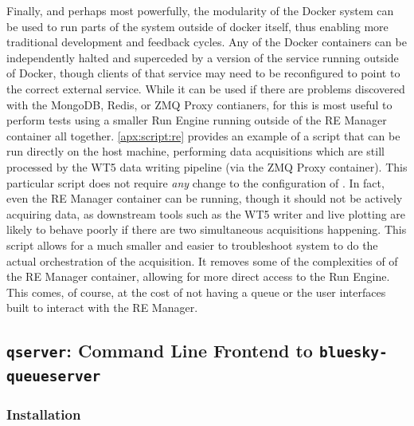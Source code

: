 Finally, and perhaps most powerfully, the modularity of the Docker system can be used to run parts of the system outside of docker itself, thus enabling more traditional development and feedback cycles.
Any of the Docker containers can be independently halted and superceded by a version of the service running outside of Docker, though clients of that service may need to be reconfigured to point to the correct external service.
While it can be used if there are problems discovered with the MongoDB, Redis, or ZMQ Proxy contianers, for \biab this is most useful to perform tests using a smaller Run Engine running outside of the RE Manager container all together.
\ref{apx:script:re} provides an example of a script that can be run directly on the host machine, performing data acquisitions which are still processed by the WT5 data writing pipeline (via the ZMQ Proxy container).
This particular script does not require \textit{any} change to the configuration of \biab.
In fact, even the RE Manager container can be running, though it should not be actively acquiring data, as downstream tools such as the WT5 writer and live plotting are likely to behave poorly if there are two simultaneous acquisitions happening.
This script allows for a much smaller and easier to troubleshoot system to do the actual orchestration of the acquisition.
It removes some of the complexities of of the RE Manager container, allowing for more direct access to the Run Engine.
This comes, of course, at the cost of not having a queue or the user interfaces built to interact with the RE Manager.







\subsection{\texttt{qserver}: Command Line Frontend to \texttt{bluesky-queueserver}}

\subsubsection{Installation}

